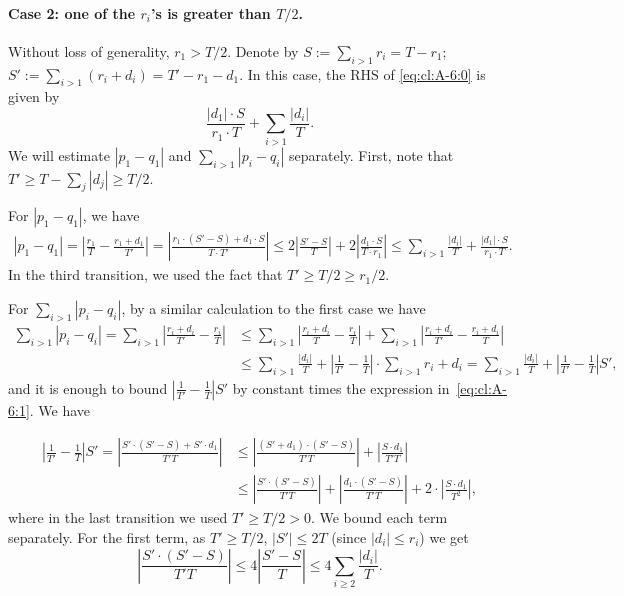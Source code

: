 \documentclass[10pt,a4paper]{article}
\newcommand\card[1]{\left| {#1} \right|}
\renewcommand\geq{\geqslant}
\renewcommand\leq{\leqslant}
\renewcommand\le{\leqslant}
\begin{document}
	\paragraph{Case 2: one of the $r_i$'s is greater than $T/2$.}
	Without loss of generality, $r_1>T/2$. Denote by $S:=\sum_{i>1} r_i = T-r_1$; $S':=\sum_{i>1} (r_i+d_i) = T'-r_1-d_1$.
	 In this case, the RHS of \eqref{eq:cl:A-6:0} is given by
	 \begin{equation}
	 \label{eq:cl:A-6:1}
	 \frac{|d_1| \cdot S}{r_1\cdot T} + \sum_{i>1} \frac{|d_i|}{T}.
	 \end{equation}
	 We will estimate $|p_1-q_1|$ and $\sum_{i>1} |p_i-q_i|$ separately. First,
     note that $T'\geq T - \sum_{j}\card{d_j}\geq T/2$.

For $|p_1-q_1|$, we have	
	 \begin{align*}
	 |p_1-q_1|= \left| \frac{r_1}{T} - \frac{r_1+d_1}{T'} \right| =
	  \left| \frac{r_1\cdot(S'-S)+ d_1\cdot S}{T\cdot T' } \right|
\le
	   2\left| \frac{S'-S}{T} \right|+
	   2\left| \frac{ d_1\cdot S}{T\cdot r_1 } \right|
\le \sum_{i>1} \frac{|d_i|}{T} +
	    \frac{|d_1| \cdot S}{r_1\cdot T}.
	 \end{align*}
In the third transition, we used the fact that $T' \geq T/2\geq r_1/2$.
	
	 For $\sum_{i>1} |p_i-q_i|$, by a similar calculation to the first case we have
	 \begin{align*}
	 \sum_{i>1}|p_i-q_i| =  \sum_{i>1} \left| \frac{r_i+d_i}{T'} - \frac{r_i}{T} \right|
     &\le
	 \sum_{i>1} \left| \frac{r_i+d_i}{T} - \frac{r_i}{T} \right| +
	 \sum_{i>1} \left| \frac{r_i+d_i}{T'} - \frac{r_i+d_i}{T} \right|\\
     &\leq
	 \sum_{i>1} \frac{|d_i|}{T}+\left|\frac{1}{T'}-\frac{1}{T}\right|\cdot
	 \sum_{i>1} r_i+d_i
     = \sum_{i>1} \frac{|d_i|}{T} + \card{\frac{1}{T'}-\frac{1}{T}} S',
     \end{align*}
     and it is enough to bound $\card{\frac{1}{T'}-\frac{1}{T}} S'$ by constant times the expression in~\eqref{eq:cl:A-6:1}.
     We have

  \begin{align*}
     \card{\frac{1}{T'}-\frac{1}{T}} S'=
	 \left|\frac{S'\cdot (S'-S) + S'\cdot d_1}{T'T}\right|
     &\leq
	 \left|\frac{(S'+d_1)\cdot (S'-S)}{T'T}\right|+
	 \left|\frac{ S\cdot d_1}{T'T}\right|\\
     &\leq
     \left|\frac{S'\cdot (S'-S)}{T'T}\right|
     +\left|\frac{d_1\cdot (S'-S)}{T'T}\right|
	 + 2\cdot
	 \left|\frac{ S\cdot d_1}{T^2}\right|,
	 \end{align*}
where in the last transition we used $T' \geq T/2 > 0$.
We bound each term separately.
For the first term, as $T'\geq T/2$, $\card{S'}\leq 2T$ (since $\card{d_i}\leq r_i$) we get
\[
\card{\frac{S'\cdot (S'-S)}{T'T}}
\leq 4\card{\frac{S'-S}{T}}
\leq 4\sum\limits_{i\geq 2}{\frac{\card{d_i}}{T}}.
\]
\end{document}
